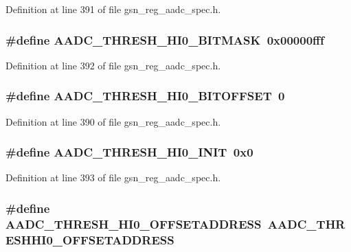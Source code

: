 Definition at line 391 of file gsn\_\-reg\_\-aadc\_\-spec.h.

\hypertarget{a00543_ac008c6abe9e2dba44028fdce929cecb3}{
\subsubsection[{AADC\_\-THRESH\_\-HI0\_\-BITMASK}]{\setlength{\rightskip}{0pt plus 5cm}\#define AADC\_\-THRESH\_\-HI0\_\-BITMASK~0x00000fff}}
\label{a00543_ac008c6abe9e2dba44028fdce929cecb3}


Definition at line 392 of file gsn\_\-reg\_\-aadc\_\-spec.h.

\hypertarget{a00543_ad3b87e5bc35c14525c69094f2eb17430}{
\subsubsection[{AADC\_\-THRESH\_\-HI0\_\-BITOFFSET}]{\setlength{\rightskip}{0pt plus 5cm}\#define AADC\_\-THRESH\_\-HI0\_\-BITOFFSET~0}}
\label{a00543_ad3b87e5bc35c14525c69094f2eb17430}


Definition at line 390 of file gsn\_\-reg\_\-aadc\_\-spec.h.

\hypertarget{a00543_afb968c3639be8d03993b295d7dfdceb2}{
\subsubsection[{AADC\_\-THRESH\_\-HI0\_\-INIT}]{\setlength{\rightskip}{0pt plus 5cm}\#define AADC\_\-THRESH\_\-HI0\_\-INIT~0x0}}
\label{a00543_afb968c3639be8d03993b295d7dfdceb2}


Definition at line 393 of file gsn\_\-reg\_\-aadc\_\-spec.h.

\hypertarget{a00543_a5fc112b61373acd15072e4f90067b6de}{
\subsubsection[{AADC\_\-THRESH\_\-HI0\_\-OFFSETADDRESS}]{\setlength{\rightskip}{0pt plus 5cm}\#define AADC\_\-THRESH\_\-HI0\_\-OFFSETADDRESS~AADC\_\-THRESHHI0\_\-OFFSETADDRESS}}
\label{a00543_a5fc112b61373acd15072e4f90067b6de}



